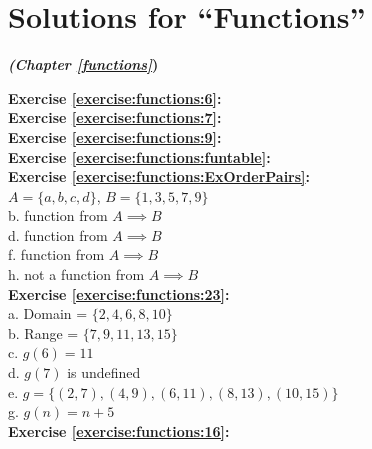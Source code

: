 \section{Solutions for ``Functions''}
\noindent\textbf{\textit{ (Chapter \ref{functions}})}\bigskip


\noindent\textbf{Exercise \ref{exercise:functions:6}:}\\

\noindent\textbf{Exercise \ref{exercise:functions:7}:}\\

\noindent\textbf{Exercise \ref{exercise:functions:9}:}\\

\noindent\textbf{Exercise \ref{exercise:functions:funtable}:}\\

\noindent\textbf{Exercise \ref{exercise:functions:ExOrderPairs}:}\\
$A=\{a,b,c,d\}$, $B=\{1,3,5,7,9\}$\\
b. function from $A \implies B$\\
d. function from $A \implies B$\\
f. function from $A \implies B$\\
h. not a function from $A \implies B$\\


\noindent\textbf{Exercise \ref{exercise:functions:23}:}\\
a. Domain = $\{2,4,6,8,10\}$\\
b. Range = $\{7,9,11,13,15\}$\\
c. $g(6)=11$\\
d. $g(7)$ is undefined\\
e. $g=\{(2,7),(4,9),(6,11),(8,13),(10,15)\}$\\
g. $g(n)=n+5$\\


\noindent\textbf{Exercise \ref{exercise:functions:16}:}\\


